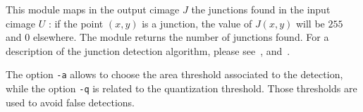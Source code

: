 This module maps in the output cimage $J$ the junctions found in 
the input cimage $U$ : if the point $(x,y)$ is a junction, the
value of $J(x,y)$ will be $255$ and $0$ elsewhere.
The module returns the number of junctions found.
For a description of the junction detection 
algorithm, please
see~\cite{caselles.coll.ea:kanizsa},\cite{caselles.coll.ea:topographic} 
and~\cite{froment:functional}.

The option \verb+-a+ allows to choose the area threshold associated
to the detection, while the option \verb+-q+ is related to the quantization 
threshold. Those thresholds are used to avoid false detections.

